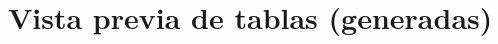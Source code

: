 \documentclass[journal]{IEEEtran}
\begin{document}
\section*{Vista previa de tablas (generadas)}

\clearpage

\clearpage

\clearpage



\clearpage



\clearpage
\clearpage
\printbibliography
\end{document}
